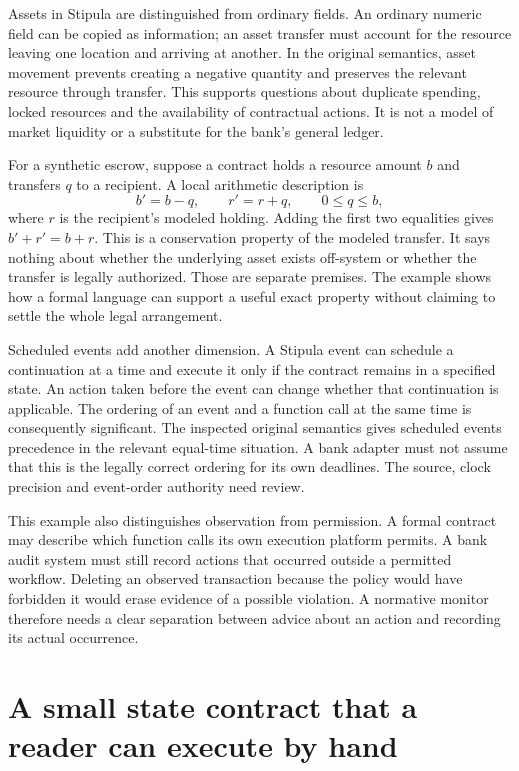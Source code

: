 \documentclass[12pt,a4paper,oneside,openany]{book}
\begin{document}
Assets in Stipula are distinguished from ordinary fields. An ordinary numeric
field can be copied as information; an asset transfer must account for the
resource leaving one location and arriving at another. In the original
semantics, asset movement prevents creating a negative quantity and preserves
the relevant resource through transfer. This supports questions about duplicate
spending, locked resources and the availability of contractual actions. It is
not a model of market liquidity or a substitute for the bank's general ledger.

For a synthetic escrow, suppose a contract holds a resource amount $b$ and
transfers $q$ to a recipient. A local arithmetic description is
\begin{equation}
 b'=b-q,\qquad r'=r+q,\qquad 0\leq q\leq b,
 \label{eq:asset-transfer}
\end{equation}
where $r$ is the recipient's modeled holding. Adding the first two equalities
gives $b'+r'=b+r$. This is a conservation property of the modeled transfer.
It says nothing about whether the underlying asset exists off-system or whether
the transfer is legally authorized. Those are separate premises. The example
shows how a formal language can support a useful exact property without
claiming to settle the whole legal arrangement.

Scheduled events add another dimension. A Stipula event can schedule a
continuation at a time and execute it only if the contract remains in a
specified state. An action taken before the event can change whether that
continuation is applicable. The ordering of an event and a function call at
the same time is consequently significant. The inspected original semantics
gives scheduled events precedence in the relevant equal-time situation. A bank
adapter must not assume that this is the legally correct ordering for its own
deadlines. The source, clock precision and event-order authority need review.

This example also distinguishes observation from permission. A formal contract
may describe which function calls its own execution platform permits. A bank
audit system must still record actions that occurred outside a permitted
workflow. Deleting an observed transaction because the policy would have
forbidden it would erase evidence of a possible violation. A normative monitor
therefore needs a clear separation between advice about an action and recording
its actual occurrence.

\section{A small state contract that a reader can execute by hand}
\end{document}
